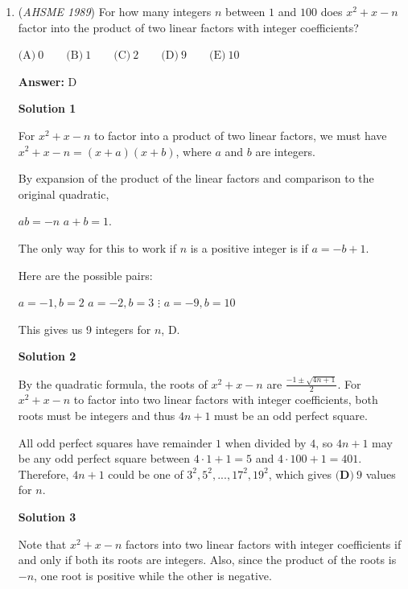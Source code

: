 \begin{enumerate}
Since $M$ is the midpoint of hypotenuse $\overline{AC}$ of $\triangle AHC$, $M$ is the circumcenter of $\triangle AHC$ and thus $MA = MH = MC$. So $\triangle MHC$ is isosceles and $\angle MHC = \angle C = \boxed{\textbf{(C)}\ 30^\circ}$.

 


	\item (\textit{AHSME 1989}) For how many integers $n$ between $1$ and $100$ does $x^{2}+x-n$ factor into the product of two linear factors with integer coefficients?


 $\textrm{(A)}\ 0\qquad\textrm{(B)}\ 1\qquad\textrm{(C)}\ 2\qquad\textrm{(D)}\ 9\qquad\textrm{(E)}\ 10$

 \textbf{Answer: }D



\textbf{Solution 1}

For $x^2+x-n$ to factor into a product of two linear factors, we must have $x^2+x-n = (x + a)(x + b)$, where $a$ and $b$ are integers.

 By expansion of the product of the linear factors and comparison to the original quadratic,

 $ab = -n$
$a + b = 1$.

 The only way for this to work if $n$ is a positive integer is if $a = -b +1$.

 Here are the possible pairs:

 $a = -1, b = 2$
$a = -2, b = 3$
$\vdots$
$a = -9, b = 10$

 

 This gives us 9 integers for $n$, $\boxed{\text{D}}$.

 



\textbf{Solution 2}

By the quadratic formula, the roots of $x^2+x-n$ are $\frac{-1 \pm \sqrt{4n+1}}{2}$.  For $x^2+x-n$ to factor into two linear factors with integer coefficients, both roots must be integers and thus $4n+1$ must be an odd perfect square.

 All odd perfect squares have remainder $1$ when divided by $4$, so $4n+1$ may be any odd perfect square between $4\cdot 1 + 1 = 5$ and $4 \cdot 100 + 1 = 401$.  Therefore, $4n+1$ could be one of $3^2, 5^2, ..., 17^2, 19^2$, which gives $\boxed{\textbf{(D)}\ 9}$ values for $n$.

 



\textbf{Solution 3}

Note that $x^2+x-n$ factors into two linear factors with integer coefficients if and only if both its roots are integers.  Also, since the product of the roots is $-n$, one root is positive while the other is negative.


\end{enumerate}
